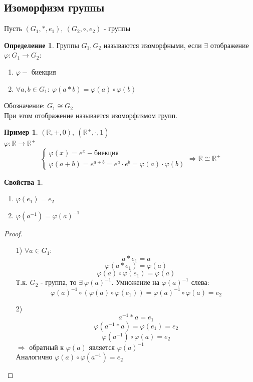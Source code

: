 \documentclass[a4paper, 12pt]{article}
\newcommand{\R}{\mathbb R}
\renewcommand{\phi}{\varphi}
\newcommand\tab[1][.5cm]{\hspace*{#1}}
\theoremstyle{definition}
\newtheorem*{definition}{Определение}
\newtheorem*{example1}{Пример}
\newtheorem*{properties}{Свойства}
\begin{document}
  \subsection{Изоморфизм группы}
  Пусть $(G_1, *, e_1), \ (G_2, \circ, e_2)$  - группы
  \begin{definition}
    Группы $G_1, G_2$ называются изоморфными, если $\exists $ отображение $\phi: G_1 \to G_2: $
    \begin{enumerate}
      \item $\phi - $ биекция
      \item $\forall a,b \in G_1: \ \phi(a*b) = \phi(a)\circ\phi(b)$  
    \end{enumerate}
  Обозначение: $G_1\cong G_2$ \\
  При этом отображение называется изоморфизмом групп.  
  \end{definition} 
  \begin{example1}
    $(\R, +, 0), \ (\R^{+}, \cdot, 1)$ \\
    $\phi:\R \to \R^{+}$
    $$\begin{cases}
    \phi(x) = e^x - \text{биекция}\\
    \phi(a+b) = e^{a+b} = e^a \cdot e^b = \phi(a) \cdot \phi(b)
  \end{cases} \Longrightarrow \R \cong \R^+ $$
  \end{example1}
  \begin{properties} \tab
    \begin{enumerate}
      \item $\phi(e_1) = e_2$
      \item $\phi(a^{-1}) = \phi(a)^{-1}$  
    \end{enumerate}
  \end{properties}
  \begin{proof} \tab
    \begin{itemize}
      \item[1)] $\forall a \in G_1:$ $$a * e_1 = a$$ 
      $$\phi(a*e_1) = \phi(a)$$ 
      $$\phi(a) \circ \phi(e_1) = \phi(a)$$
      Т.к. $G_2$ - группа, то $\exists \ \phi(a)^{-1}$. Умножение на $\phi(a)^{-1}$ слева: $$\phi(a)^{-1} \circ (\phi(a) \circ \phi(e_1)) = \phi(a)^{-1} \circ \phi(a) = e_2$$
      \item[2)] $$a^{-1} * a = e_1$$
      $$\phi(a^{-1} * a) = \phi(e_1)= e_2$$
    $$\phi(a^{-1}) \circ \phi(a) = e_2$$
    $\Longrightarrow $ обратный к $\phi(a)$ является $\phi(a)^{-1}$ \\
    Аналогично $\phi(a) \circ \phi(a^{-1}) = e_2$     
    \end{itemize}
  \end{proof} 
\end{document}
